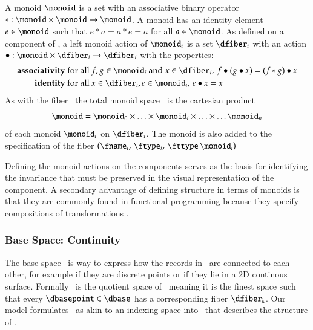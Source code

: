 \documentclass[journal]{vgtc}                %
\begin{document}
A monoid \cite{Monoid2021} $\monoid$ is a set with an associative binary operator $\ast:\monoid \times \monoid\rightarrow \monoid$. A monoid has an identity element $e\in \monoid$ such that $e\ast a= a \ast e = a$ for all $a \in \monoid$. As defined on a component of \dfiber, a left monoid action \cite{SemigroupAction2021,ActionNLab} of $\monoid_i$ is a set $\dfiber_i$ with an action $\bullet: \monoid\times \dfiber_i \rightarrow \dfiber_i$ with the properties:
\begin{align*}
    \textbf{associativity}\;& \text{for all } f,g \in \monoid_i \text{ and } x\in \dfiber_i,\, f\bullet(g\bullet x) = (f\ast g) \bullet x\\
    \textbf{identity}\;& \text{for all } x\in \dfiber_i, e\in \monoid_i,\,  e\bullet x = x 
\end{align*}
As with the fiber \dfiber\, the total monoid space \monoid\ is the cartesian product
\begin{equation}
\monoid= \monoid_{0} \times \ldots \times \monoid_{i}\times \ldots \times\ldots \monoid_{n}
\end{equation}
of each monoid $\monoid_{i}$ on $\dfiber_{i}$.  The monoid is also added to the specification of the fiber $(\fname_i,\, \ftype_i,\, \fttype\, \monoid_i)$

Defining the monoid actions on the components serves as the basis for identifying the invariance\cite{kindlmannAlgebraicProcessVisualization2014} that must be preserved in the visual representation of the component. A secondary advantage of defining structure in terms of monoids is that they are commonly found in functional programming because they specify compositions of transformations \cite{yorgeyMonoidsThemeVariations, stievenMonadJustMonoid2020}.

\subsubsection{Base Space: Continuity}
\label{sec:math:data:base}
 The base space \dbase\ is way to express how the records in \dtotal\ are connected to each other, for example if they are discrete points or if they lie in a 2D continous surface. Formally \dbase\ is the quotient space of \dtotal\, meaning it is the finest space\cite{aurouxMath131Introduction} such that every $\dbasepoint \in \dbase$ has a corresponding fiber $\dfiber_k$\cite{QuotientSpaceTopology2020}. Our model formulates \dbase\ as akin to an indexing space into \dtotal\ that describes the structure of \dtotal.  
 
\end{document}
